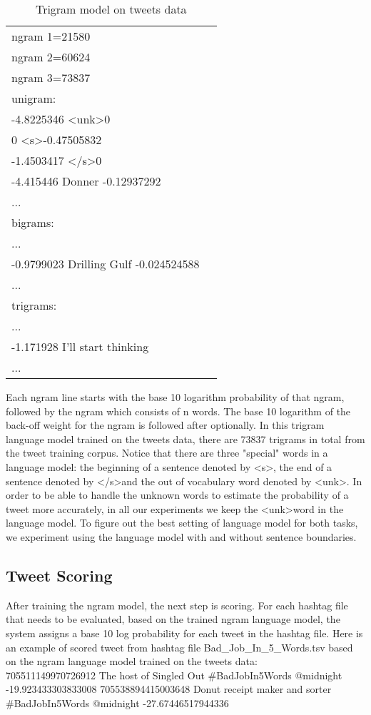 \documentclass[11pt,a4paper]{article}
\begin{document}
\begin{table}[h!]
\begin{tabular}{ |l |c|}
\hline
ngram 1=21580 \\
ngram 2=60624 \\
ngram 3=73837 \\
\hline
unigram:\\
-4.8225346   \textless unk\textgreater  0 \\
0   \textless s\textgreater  -0.47505832 \\
-1.4503417   \textless /s\textgreater  0 \\
-4.415446   Donner  -0.12937292 \\
...\\
\hline
bigrams:\\
...\\
-0.9799023  Drilling Gulf -0.024524588\\
...\\
\hline
trigrams:\\
...\\
-1.171928 I'll start thinking\\
...\\
\hline
\end{tabular}
\caption{Trigram model on tweets data}
\label{table:1}
\end{table}
\noindent
Each ngram line starts with the base 10 logarithm probability of that ngram, followed by the ngram which consists of n words. The base 10 logarithm of the back-off weight for the ngram is followed after optionally. In this trigram language model trained on the tweets data, there are 73837 trigrams in total from the tweet training corpus. Notice that there are three "special" words in a language model: the beginning of a sentence denoted by \textless s\textgreater, the end of a sentence denoted by \textless /s\textgreater and the out of vocabulary word denoted by \textless unk\textgreater. In order to be able to handle the unknown words to estimate the probability of a tweet more accurately, in all our experiments we keep the \textless unk\textgreater word in the language model. To figure out the best setting of language model for both tasks, we experiment using the language model with and without sentence boundaries.

\subsection{Tweet Scoring}
After training the ngram model, the next step is scoring. For each hashtag file that needs to be evaluated, based on the trained ngram language model, the system assigns a base 10 log probability for each tweet in the hashtag file. Here is an example of scored tweet from hashtag file Bad\_Job\_In\_5\_Words.tsv based on the ngram language model trained on the tweets data:\\
705511149970726912  The host of Singled Out \#BadJobIn5Words @midnight -19.923433303833008
705538894415003648  Donut receipt maker and sorter  \#BadJobIn5Words @midnight -27.67446517944336
\end{document}
